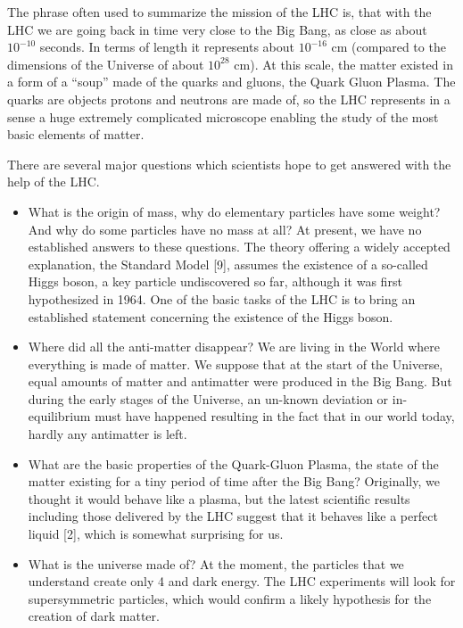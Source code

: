 The phrase often used to summarize the mission of the LHC is, that
with the LHC we are going back in time very close to the Big Bang,
as close as about $10^{-10}$ seconds. In terms of length it represents
about $10^{-16}$ cm (compared to the dimensions of the Universe of about
$10^{28}$ cm). At this scale, the matter existed in a form of a ``soup''
made of the quarks and gluons, the Quark Gluon Plasma. The quarks
are objects protons and neutrons are made of, so the LHC represents
in a sense a huge extremely complicated microscope enabling the
study of the most basic elements of matter.

There are several major questions which scientists hope to
get answered with the help of the LHC.

\begin{itemize}
\item What is the origin of mass, why do elementary particles have
some weight? And why do some particles have no mass at all? At
present, we have no established answers to these questions. The
theory offering a widely accepted explanation, the Standard Model
[9], assumes the existence of a so-called Higgs boson, a key particle
undiscovered so far, although it was first hypothesized in 1964. One
of the basic tasks of the LHC is to bring an established statement
concerning the existence of the Higgs boson.

\item Where did all the anti-matter disappear? We are living in the
World where everything is made of matter. We suppose that at the
start of the Universe, equal amounts of matter and antimatter were
produced in the Big Bang. But during the early stages of the
Universe, an un-known deviation or in-equilibrium must have happened
resulting in the fact that in our world today, hardly any antimatter
is left.

\item What are the basic properties of the Quark-Gluon Plasma, the
state of the matter existing for a tiny period of time after the Big
Bang? Originally, we thought it would behave like a plasma, but the
latest scientific results including those delivered by the LHC
suggest that it behaves like a perfect liquid [2],
which is somewhat surprising for us.

\item What is the universe made of? At the moment, the particles that we understand 
create only 4%
and dark energy. The LHC experiments will look for supersymmetric particles, which
 would confirm a likely hypothesis for the creation of dark matter.
\end{itemize}

